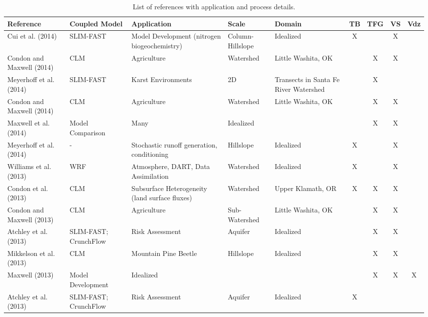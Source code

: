 {\scriptsize
\begin{table}
\renewcommand{\arraystretch}{2.5}
\center
\caption{List of \parflow{} references with application and process details.}
\begin{tabular}{ l  p{1.5cm} p{2cm} p{1.5cm} p{1.5cm} | c | c | c | c }
\bf{Reference} & \bf{Coupled Model} & \bf{Application} & \bf{Scale} & \bf{Domain} & \bf{TB} & \bf{TFG} & \bf{VS} & \bf{Vdz} \\ 
\hline{}

\cite{Cui14} Cui et al. (2014) & SLIM-FAST & Model Development (nitrogen biogeochemistry) & Column-Hillslope & Idealized & X &   & X &     \\
\cite{Condon14b} Condon and Maxwell (2014) & CLM & Agriculture & Watershed & Little Washita, OK &  & X& X &     \\
\cite{Meyerhoff14b} Meyerhoff et al. (2014) & SLIM-FAST & Karst Environments & 2D & Transects in Santa Fe River Watershed &   & X &   &       \\
\cite{Condon14a} Condon and Maxwell (2014) & CLM & Agriculture & Watershed & Little Washita, OK &   & X & X &     \\
\cite{M14} Maxwell et al. (2014) & Model Comparison & Many  & Idealized  &   &   & X & X &     \\ 
\cite{Meyerhoff14a} Meyerhoff et al. (2014) & - & Stochastic runoff generation, conditioning & Hillslope & Idealized & X &   & X &     \\
\cite{Williams13} Williams et al. (2013) & WRF & Atmosphere, DART, Data Assimilation & Watershed & Idealized & X &   & X &     \\
\cite{Condon13b} Condon et al. (2013) & CLM & Subsurface Heterogeneity (land surface fluxes) & Watershed & Upper Klamath, OR & X & X & X &     \\
\cite{Condon13a} Condon and Maxwell (2013) & CLM & Agriculture & Sub-Watershed & Little Washita, OK &   & X & X &     \\
\cite{Atchley13b} Atchley et al. (2013) & SLIM-FAST; CrunchFlow & Risk Assessment & Aquifer & Idealized &   & X & X &     \\
\cite{Mikkelson13} Mikkelson et al. (2013) & CLM & Mountain Pine Beetle & Hillslope & Idealized &   & X & X &     \\
\cite{M13} Maxwell (2013) & Model Development & Idealized &   &   &   & X & X & X   \\
\cite{Atchley13a} Atchley et al. (2013) & SLIM-FAST; CrunchFlow & Risk Assessment & Aquifer & Idealized & X &   &   &     \\ 
\end{tabular}
\label{pfref1}
\end{table}

}
